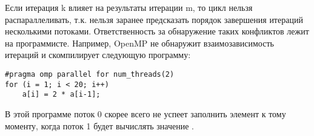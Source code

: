 Если итерация k влияет на результаты итерации m, то цикл нельзя распараллеливать, т.к. нельзя заранее предсказать порядок завершения итераций несколькими потоками.  Ответственность за обнаружение таких конфликтов лежит на программисте. Например, OpenMP не обнаружит взаимозависимость итераций и скомпилирует следующую программу:

\begin{verbatim}
#pragma omp parallel for num_threads(2)
for (i = 1; i < 20; i++)
    a[i] = 2 * a[i-1];
\end{verbatim}

В этой программе поток 0 скорее всего не успеет заполнить элемент  к тому моменту, когда поток 1 будет вычислять значение .
